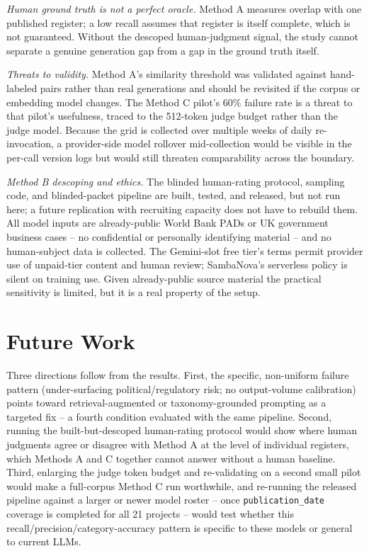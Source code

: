 \documentclass[10pt, conference, letterpaper]{IEEEtran}
\begin{document}
\textit{Human ground truth is not a perfect oracle.} Method A measures
overlap with one published register; a low recall assumes that register is
itself complete, which is not guaranteed. Without the descoped
human-judgment signal, the study cannot separate a genuine generation gap
from a gap in the ground truth itself.

\textit{Threats to validity.} Method A's similarity threshold was validated
against hand-labeled pairs rather than real generations and should be
revisited if the corpus or embedding model changes. The Method C pilot's
60\% failure rate is a threat to that pilot's usefulness, traced to the
512-token judge budget rather than the judge model. Because the grid is
collected over multiple weeks of daily re-invocation, a provider-side model
rollover mid-collection would be visible in the per-call version logs but
would still threaten comparability across the boundary.

\textit{Method B descoping and ethics.} The blinded human-rating protocol,
sampling code, and blinded-packet pipeline are built, tested, and released,
but not run here; a future replication with recruiting capacity does not
have to rebuild them. All model inputs are already-public World Bank PADs
or UK government business cases -- no confidential or personally
identifying material -- and no human-subject data is collected. The
Gemini-slot free tier's terms permit provider use of unpaid-tier content
and human review; SambaNova's serverless policy is silent on training use.
Given already-public source material the practical sensitivity is limited,
but it is a real property of the setup.

\section{Future Work}
\label{sec:future-work}
Three directions follow from the results. First, the specific, non-uniform
failure pattern (under-surfacing political/regulatory risk; no
output-volume calibration) points toward retrieval-augmented or
taxonomy-grounded prompting as a targeted fix -- a fourth condition
evaluated with the same pipeline. Second, running the built-but-descoped
human-rating protocol would show where human judgments agree or disagree
with Method A at the level of individual registers, which Methods A and C
together cannot answer without a human baseline. Third, enlarging the judge
token budget and re-validating on a second small pilot would make a
full-corpus Method C run worthwhile, and re-running the released pipeline
against a larger or newer model roster -- once \texttt{publication\_date}
coverage is completed for all 21 projects -- would test whether this
recall/precision/category-accuracy pattern is specific to these models or
general to current LLMs.
\end{document}
